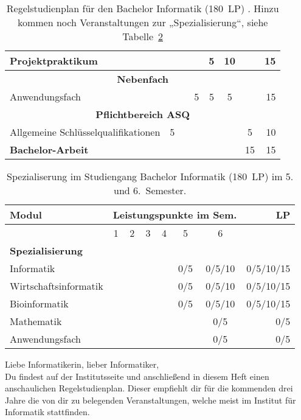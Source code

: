 \begin{table}[btp]
\begin{small}
\begin{tabularx}{\textwidth}{|X||c|c|c|c|c|c||r|}
        Projektpraktikum&&&&5&10&&15\\\hline\hline
        \multicolumn{8}{|c|}{\textbf{Nebenfach}}\\\hline
        Anwendungsfach&&&5&5&5&&15\\\hline\hline
        \multicolumn{8}{|c|}{\textbf{Pflichtbereich ASQ}}\\\hline
        Allgemeine Schlüsselqualifikationen&5&&&&&5&10\\\hline\hline
        \textbf{Bachelor-Arbeit}&&&&&&15&15\\\hline
    \end{tabularx}
    \end{small}
    \caption{Regelstudienplan für den Bachelor Informatik (180~LP)
    \label{plan-info}. Hinzu kommen noch Veranstaltungen zur „Spezialisierung“, siehe Tabelle~\ref{plan-info2}}
\end{table}

\begin{table}[!th]
    \begin{small}
    \begin{tabularx}{\textwidth}{|X||c|c|c|c|c|c||r|}
        \hline
        \textbf{Modul}&\multicolumn{6}{l||}{\textbf{Leistungspunkte im Sem.}}&\textbf{LP}\\\hline
        &1&2&3&4&5&6&\\\hline\hline
        \multicolumn{8}{|X|}{\textbf{Spezialisierung}}\\\hline
        Informatik&&&&&0/5&0/5/10&0/5/10/15\\
        Wirtschaftsinformatik&&&&&0/5&0/5/10&0/5/10/15\\
        Bioinformatik&&&&&0/5&0/5/10&0/5/10/15\\
        Mathematik&&&&&&0/5&0/5\\
        Anwendungsfach&&&&&&0/5&0/5\\\hline
    \end{tabularx}
    \end{small}
    \caption{Spezialiserung im Studiengang Bachelor Informatik (180~LP) im 5. und 6.~Semester. \label{plan-info2}}
\end{table}

Liebe Informatikerin, lieber Informatiker,\\
Du findest auf der Institutsseite und anschließend in diesem Heft einen anschaulichen Regelstudienplan.
Dieser empfiehlt dir für die kommenden drei Jahre die von dir zu belegenden Veranstaltungen, welche meist im Institut für Informatik stattfinden.

